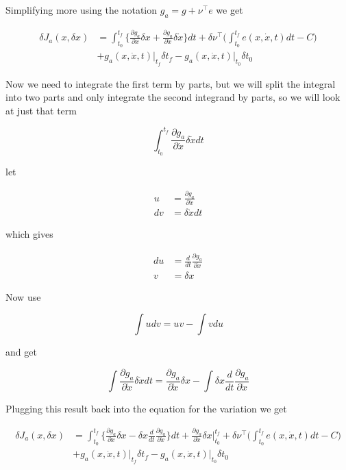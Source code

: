 \documentclass[11pt,letterpaper,onecolumn,notitlepage]{article}
\begin{document}
Simplifying more using the notation $g_{a}=g+\nu^{\top}e$ we get

\begin{align*}
  \delta J_{a}(x,\delta x)&=
  \int_{t_{0}}^{t_{f}}\biggr\{\frac{\partial{}g_{a}}{\partial{}x}\delta x+\frac{\partial{}g_{a}}{\partial\dot{x}}\delta\dot{x}\biggr\}dt
  +\delta\nu^{\top}\biggr(\int_{t_{0}}^{t_{f}}e(x,\dot{x},t)dt-C\biggr) \\
  &+g_{a}(x,\dot{x},t)\biggr|_{t_{f}}\delta t_{f}
  -g_{a}(x,\dot{x},t)\biggr|_{t_{0}}\delta t_{0}
\end{align*}

Now we need to integrate the first term by parts, but we will split the integral into two parts and only integrate the second integrand by parts, so we will look at just that term

\begin{equation*}
  \int_{t_{0}}^{t_{f}}\frac{\partial{}g_{a}}{\partial\dot{x}}\delta\dot{x}dt
\end{equation*}

let

\begin{align*}
  u&=\frac{\partial{}g_{a}}{\partial\dot{x}} \\
  dv&=\delta\dot{x}dt
\end{align*}

which gives

\begin{align*}
  du&=\frac{d}{dt}\frac{\partial{}g_{a}}{\partial\dot{x}} \\
  v&=\delta x
\end{align*}

Now use

\begin{equation*}
  \int udv=uv-\int vdu
\end{equation*}

and get

\begin{equation*}
  \int \frac{\partial{}g_{a}}{\partial\dot{x}}\delta\dot{x}dt
  =
  \frac{\partial{}g_{a}}{\partial\dot{x}}\delta x
  -\int\delta x\frac{d}{dt}\frac{\partial{}g_{a}}{\partial\dot{x}}
\end{equation*}

Plugging this result back into the equation for the variation we get

\begin{align*}
  \delta J_{a}(x,\delta x)&=
  \int_{t_{0}}^{t_{f}}\biggr\{\frac{\partial{}g_{a}}{\partial{}x}\delta x-\delta x\frac{d}{dt}\frac{\partial{}g_{a}}{\partial\dot{x}}\biggr\}dt
  +\frac{\partial{}g_{a}}{\partial\dot{x}}\delta x\biggr|_{t_{0}}^{t_{f}}
  +\delta\nu^{\top}\biggr(\int_{t_{0}}^{t_{f}}e(x,\dot{x},t)dt-C\biggr) \\
  &+g_{a}(x,\dot{x},t)\biggr|_{t_{f}}\delta t_{f}
  -g_{a}(x,\dot{x},t)\biggr|_{t_{0}}\delta t_{0}
\end{align*}
\end{document}
